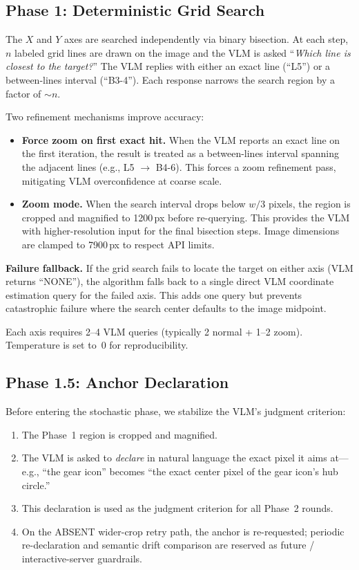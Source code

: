 \documentclass[sigconf,nonacm]{acmart}
\begin{document}
\subsection{Phase 1: Deterministic Grid Search}
\label{sec:phase1}

The $X$ and $Y$ axes are searched independently via binary bisection.
At each step, $n$ labeled grid lines are drawn on the image and the VLM
is asked ``\emph{Which line is closest to the target?}''  The VLM
replies with either an exact line (``L5'') or a between-lines interval
(``B3-4'').  Each response narrows the search region by a factor of
$\sim n$.

Two refinement mechanisms improve accuracy:

\begin{itemize}
  \item \textbf{Force zoom on first exact hit.}
    When the VLM reports an exact line on the first iteration, the
    result is treated as a between-lines interval spanning the adjacent
    lines (e.g., L5 $\to$ B4-6).  This forces a zoom refinement pass,
    mitigating VLM overconfidence at coarse scale.
  \item \textbf{Zoom mode.}
    When the search interval drops below $w/3$ pixels, the region is
    cropped and magnified to 1200\,px before re-querying.  This
    provides the VLM with higher-resolution input for the final
    bisection steps.  Image dimensions are clamped to 7900\,px to
    respect API limits.
\end{itemize}

\textbf{Failure fallback.}  If the grid search fails to locate the
target on either axis (VLM returns ``NONE''), the algorithm falls back
to a single direct VLM coordinate estimation query for the failed
axis.  This adds one query but prevents catastrophic failure where the
search center defaults to the image midpoint.

Each axis requires 2--4 VLM queries (typically 2 normal + 1--2 zoom).
Temperature is set to~0 for reproducibility.


\subsection{Phase 1.5: Anchor Declaration}
\label{sec:anchor}

Before entering the stochastic phase, we stabilize the VLM's judgment
criterion:

\begin{enumerate}
  \item The Phase~1 region is cropped and magnified.
  \item The VLM is asked to \emph{declare} in natural language
    the exact pixel it aims at---e.g., ``the gear icon'' becomes
    ``the exact center pixel of the gear icon's hub circle.''
  \item This declaration is used as the judgment criterion for all
    Phase~2 rounds.
  \item On the ABSENT wider-crop retry path, the anchor is
    re-requested; periodic re-declaration and semantic drift
    comparison are reserved as future / interactive-server
    guardrails.
\end{enumerate}
\end{document}
